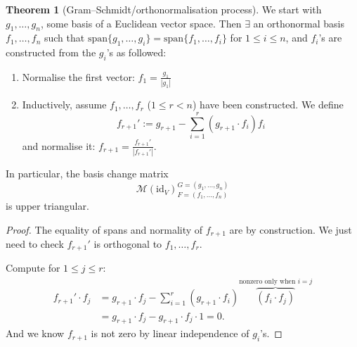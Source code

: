 \documentclass[a4paper]{article}
\newcommand{\spanset}{\text{span}}
\theoremstyle{definition}
\newtheorem{thm}[defn]{Theorem}
\begin{document}
\begin{thm}[Gram–Schmidt/orthonormalisation process]
We start with $g_1,\ldots,g_n$, some basis of a Euclidean vector space. Then $\exists$ an orthonormal basis $f_1,\ldots,f_n$ such that $\spanset \{g_1,\ldots,g_i\}=\spanset \{f_1,\ldots,f_i\}$ for $1\leq i\leq n$, and $f_i$'s are constructed from the $g_i$'s as followed:
\begin{enumerate}
    \item Normalise the first vector: $f_1=\frac{g_1}{|g_1|}$
    \item Inductively, assume $f_1,\ldots,f_r$ ($1\leq r <n$) have been constructed. We define
    \[
    f_{r+1}':=g_{r+1}-\sum_{i=1}^r \left(g_{r+1}\cdot f_i \right) f_i
    \]
    and normalise it: $f_{r+1}=\frac{f_{r+1}'}{|f_{r+1}'|}$.
\end{enumerate}
In particular, the basis change matrix
\[
\mathcal M(\text{id}_V)_{F=(f_1,\ldots,f_n)}^{G=(g_1,\ldots,g_n)}
\]
is upper triangular.
\end{thm}
\begin{proof}
The equality of spans and normality of $f_{r+1}$ are by construction. We just need to check $f_{r+1}'$ is orthogonal to $f_1,\ldots,f_r$.

Compute for $1\leq j \leq r$:
\[
\begin{aligned}
f_{r+1}' \cdot f_j &= g_{r+1}\cdot f_j - \sum_{i=1}^r (g_{r+1}\cdot f_i)\overbrace{(f_i \cdot f_j)}^{\text{nonzero only when }i=j} \\
&=g_{r+1}\cdot f_j-g_{r+1}\cdot f_j \cdot 1 = 0.
\end{aligned}
\]
And we know $f_{r+1}$ is not zero by linear independence of $g_i$'s.
\end{proof}
\end{document}
